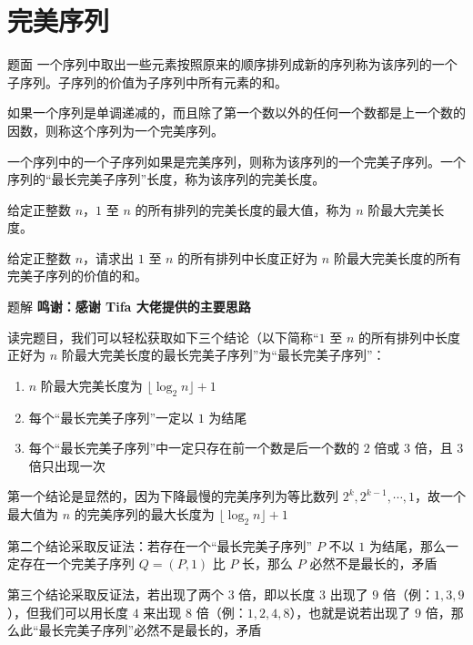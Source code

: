 \documentclass{pptt}
\begin{document}
\section{完美序列}

\begin{frame}{题面}
    一个序列中取出一些元素按照原来的顺序排列成新的序列称为该序列的一个子序列。子序列的价值为子序列中所有元素的和。

    如果一个序列是单调递减的，而且除了第一个数以外的任何一个数都是上一个数的因数，则称这个序列为一个完美序列。

    一个序列中的一个子序列如果是完美序列，则称为该序列的一个完美子序列。一个序列的“最长完美子序列”长度，称为该序列的完美长度。

    给定正整数 $n$，$1$ 至 $n$ 的所有排列的完美长度的最大值，称为 $n$ 阶最大完美长度。

    给定正整数 $n$，请求出 $1$ 至 $n$ 的所有排列中长度正好为 $n$ 阶最大完美长度的所有完美子序列的价值的和。
\end{frame}

\begin{frame}{题解}
    \textbf{鸣谢：感谢 Tifa 大佬提供的主要思路}

    读完题目，我们可以轻松获取如下三个结论（以下简称“$1$ 至 $n$ 的所有排列中长度正好为 $n$ 阶最大完美长度的最长完美子序列”为“最长完美子序列”：

    \begin{enumerate}
        \item $n$ 阶最大完美长度为 $\lfloor \log_2 n \rfloor + 1$
        \item 每个“最长完美子序列”一定以 $1$ 为结尾
        \item 每个“最长完美子序列”中一定只存在前一个数是后一个数的 $2$ 倍或 $3$ 倍，且 $3$ 倍只出现一次
    \end{enumerate}

    第一个结论是显然的，因为下降最慢的完美序列为等比数列 $2^k,2^{k-1},\cdots,1$，故一个最大值为 $n$ 的完美序列的最大长度为 $\lfloor \log_2 n \rfloor + 1$

    第二个结论采取反证法：若存在一个“最长完美子序列” $P$ 不以 $1$ 为结尾，那么一定存在一个完美子序列 $Q=(P,1)$ 比 $P$ 长，那么 $P$ 必然不是最长的，矛盾

    第三个结论采取反证法，若出现了两个 $3$ 倍，即以长度 $3$ 出现了 $9$ 倍（例：$1,3,9$），但我们可以用长度 $4$ 来出现 $8$ 倍（例：$1,2,4,8$），也就是说若出现了 $9$ 倍，那么此“最长完美子序列”必然不是最长的，矛盾
\end{frame}
\end{document}
